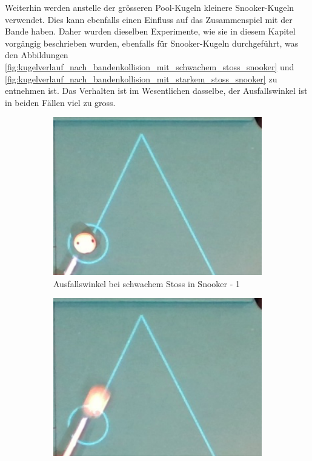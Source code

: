 \newpage
Weiterhin werden anstelle der grösseren Pool-Kugeln kleinere Snooker-Kugeln verwendet. Dies kann ebenfalls einen
Einfluss auf das Zusammenspiel mit der Bande haben. Daher wurden dieselben Experimente, wie sie in diesem Kapitel vorgängig beschrieben
wurden, ebenfalls für Snooker-Kugeln durchgeführt, was den Abbildungen \ref{fig:kugelverlauf_nach_bandenkollision_mit_schwachem_stoss_snooker}
und \ref{fig:kugelverlauf_nach_bandenkollision_mit_starkem_stoss_snooker} zu entnehmen ist.
Das Verhalten ist im Wesentlichen dasselbe, der Ausfallswinkel ist in beiden Fällen viel zu gross.

\begin{figure}[h!]
    \centering
    \begin{subfigure}[b]{0.2\textwidth}
        \centering
        \includegraphics[width=1.0\linewidth]{../common/04_results/resources/simulation/rebound_angle_slow_snooker/00_rail_rebound_angle_slow_snooker_01.png}
        \caption{Ausfallswinkel bei schwachem Stoss in Snooker - 1}
        \label{fig:rebound_angle_slow_snooker_1}
    \end{subfigure}
    \hfill
    \begin{subfigure}[b]{0.2\textwidth}
        \centering
        \includegraphics[width=1.0\linewidth]{../common/04_results/resources/simulation/rebound_angle_slow_snooker/00_rail_rebound_angle_slow_snooker_02.png}

\end{subfigure}
\end{figure}
